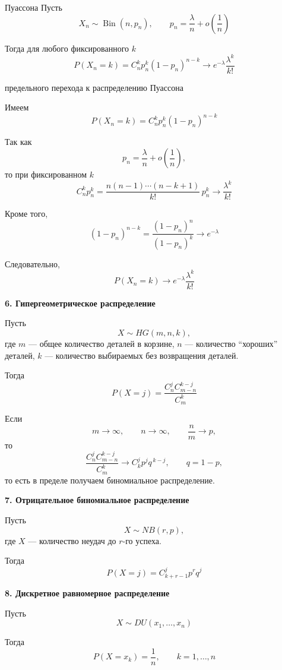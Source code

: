\documentclass[12pt,a4paper]{article}
\begin{document}
\begin{example}
\begin{theorem}{Пуассона}
Пусть
\[
X_n\sim\operatorname{Bin}(n,p_n),
\qquad
p_n=\frac{\lambda}{n}+o\left(\frac1n\right)
\]

Тогда для любого фиксированного $k$
\[
P(X_n=k)
=
C_n^k p_n^k(1-p_n)^{n-k}
\longrightarrow
e^{-\lambda}\frac{\lambda^k}{k!}
\]

\end{theorem}

\begin{proofbox}{предельного перехода к распределению Пуассона}

Имеем
\[
P(X_n=k)
=
C_n^k p_n^k(1-p_n)^{n-k}
\]

Так как
\[
p_n=\frac{\lambda}{n}+o\left(\frac1n\right),
\]
то при фиксированном $k$
\[
C_n^k p_n^k
=
\frac{n(n-1)\cdots(n-k+1)}{k!}\,p_n^k
\longrightarrow
\frac{\lambda^k}{k!}
\]

Кроме того,
\[
(1-p_n)^{n-k}
=
\frac{(1-p_n)^n}{(1-p_n)^k}
\longrightarrow e^{-\lambda}
\]

Следовательно,
\[
P(X_n=k)
\longrightarrow
e^{-\lambda}\frac{\lambda^k}{k!}
\]

\end{proofbox}

\textbf{6. Гипергеометрическое распределение}

Пусть
\[
X\sim HG(m,n,k),
\]
где $m$ --- общее количество деталей в корзине, $n$ --- количество ``хороших'' деталей, $k$ --- количество выбираемых без возвращения деталей.

Тогда
\[
P(X=j)
=
\frac{C_n^j C_{m-n}^{k-j}}{C_m^k}
\]

Если
\[
m\to\infty,
\qquad
n\to\infty,
\qquad
\frac{n}{m}\to p,
\]
то
\[
\frac{C_n^j C_{m-n}^{k-j}}{C_m^k}
\longrightarrow
C_k^j p^j q^{\,k-j},
\qquad
q=1-p,
\]
то есть в пределе получаем биномиальное распределение.

\medskip

\textbf{7. Отрицательное биномиальное распределение}

Пусть
\[
X\sim NB(r,p),
\]
где $X$ --- количество неудач до $r$-го успеха.

Тогда
\[
P(X=j)
=
C_{k+r-1}^{j}p^r q^j
\]

\medskip

\textbf{8. Дискретное равномерное распределение}

Пусть
\[
X\sim DU(x_1,\ldots,x_n)
\]

Тогда
\[
P(X=x_k)=\frac1n,
\qquad
k=1,\ldots,n
\]

\end{example}
\end{document}
